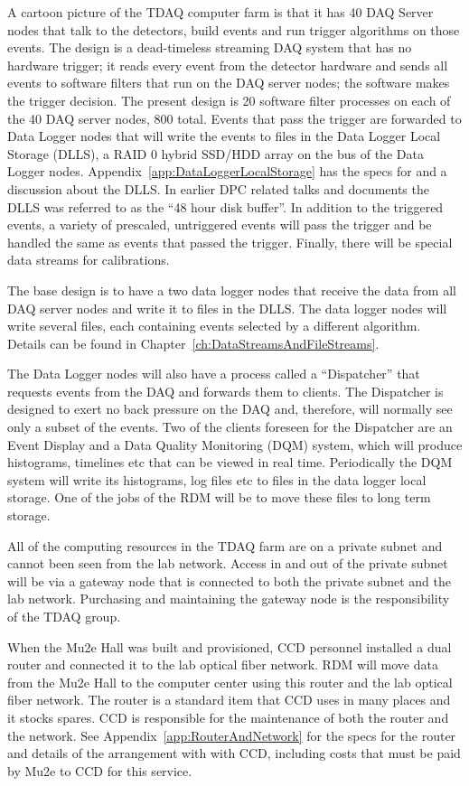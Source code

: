 A cartoon picture of the TDAQ computer farm is that it has 40 DAQ Server nodes
that talk to the detectors, build events and run trigger algorithms on those events.
The design is a dead-timeless streaming DAQ system that has no hardware trigger;
it reads every event from the detector hardware and sends all events to software filters
that run on the DAQ server nodes;
the software makes the trigger decision.
The present design is 20 software filter processes on each of the 40 DAQ server nodes, 800 total.
Events that pass the trigger are forwarded to Data Logger nodes that will write the events
to files in the Data Logger Local Storage (DLLS), a RAID 0 hybrid SSD/HDD array on the bus of the Data Logger nodes.
Appendix~\ref{app:DataLoggerLocalStorage} has the specs for and a discussion about the DLLS.
In earlier DPC related talks and documents the DLLS  was referred to as the ``48 hour disk buffer''.
In addition to the triggered events, a variety of prescaled, untriggered events will pass the
trigger and be handled the same as events that passed the trigger.
Finally, there will be special data streams for calibrations.

The base design is to have a two data logger nodes that receive the data from all DAQ server nodes
and write it to files in the DLLS.
The data logger nodes will write several files, each containing events selected by a different algorithm.
Details can be found in Chapter~\ref{ch:DataStreamsAndFileStreams}.

The Data Logger nodes will also have a process called a ``Dispatcher''
that requests events from the DAQ and forwards them to clients.
The Dispatcher is designed to exert no back pressure on the DAQ
and, therefore, will normally see only a subset of the events.
Two of the clients foreseen for the Dispatcher are an Event Display and
a Data Quality Monitoring (DQM) system,
which will produce histograms, timelines etc that can be viewed in real time.
Periodically the DQM system will write its histograms, log files etc to
files in the data logger local storage.  One of the jobs of the RDM will be
to move these files to long term storage.

All of the computing resources in the TDAQ farm are on a private subnet
and cannot been seen from the lab network.  Access in and out
of the private subnet will be via a gateway node that is connected to
both the private subnet and the lab network.
Purchasing and maintaining the gateway node is the responsibility of the TDAQ group.

When the Mu2e Hall was built and provisioned, CCD personnel installed a dual router
and connected it to the lab optical fiber network.
RDM will move data from the Mu2e Hall
to the computer center using this router and the lab optical fiber network.
The router is a standard item that CCD uses in many places and it stocks spares.
CCD is responsible for the maintenance of both the router and the network.
See Appendix~\ref{app:RouterAndNetwork} for the
specs for the router and details of the arrangement with with CCD,
including costs that must be paid by Mu2e to CCD for this service.


